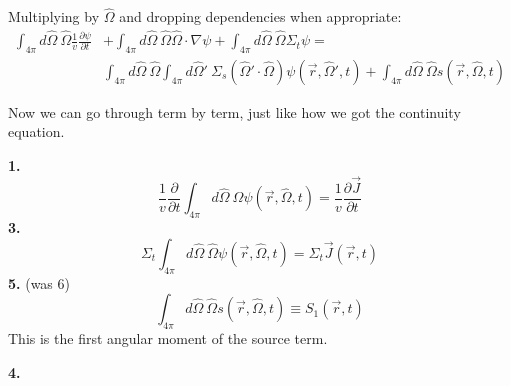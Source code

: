 \documentclass[12pt]{article}
\newcommand{\vOmega}{\ensuremath{\hat{\Omega}}}
\begin{document}
%
Multiplying by $\vOmega$ and dropping dependencies when appropriate:
%
\begin{align}
\int_{4\pi} d\vOmega\: \vOmega \frac{1}{v}\frac{\partial \psi}{\partial t} &+ 
\int_{4\pi} d\vOmega\: \vOmega \vOmega \cdot \nabla \psi + 
\int_{4\pi} d\vOmega\: \vOmega \Sigma_t \psi =\nonumber \\
&\int_{4\pi} d\vOmega\: \vOmega \int_{4\pi} d\vOmega'\: \Sigma_s(\vOmega' \cdot \vOmega) \psi(\vec{r}, \vOmega', t) +
\int_{4\pi} d\vOmega\: \vOmega s(\vec{r}, \vOmega, t)
\end{align}

Now we can go through term by term, just like how we got the continuity equation.

\textbf{1.}
\begin{equation}
\frac{1}{v}\frac{\partial}{\partial t} \int_{4\pi} d\vOmega\: \vOmega \psi(\vec{r}, \vOmega, t) = \boxed{\frac{1}{v}\frac{\partial \vec{J}}{\partial t}}
\end{equation}
\textbf{3.} 
\begin{equation}
\Sigma_t \int_{4\pi} d\vOmega\: \vOmega \psi(\vec{r}, \vOmega, t) = \boxed{\Sigma_t  \vec{J}(\vec{r}, t)}
\end{equation}
\textbf{5.} (was 6)
\begin{equation}
\int_{4\pi} d\vOmega\: \vOmega s(\vec{r}, \vOmega, t) \equiv \boxed{S_{1}(\vec{r}, t)}
\end{equation}
This is the first angular moment of the source term. 

\textbf{4.} 


%
%
\end{document}
